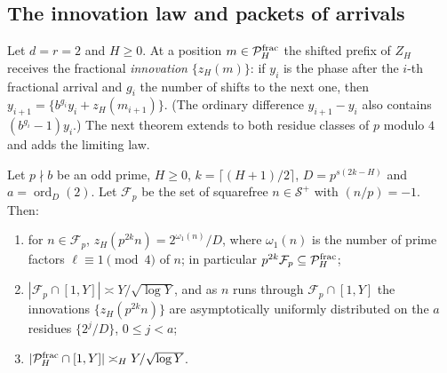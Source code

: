 \documentclass[11pt]{article}
\newcommand{\fr}[1]{\{#1\}}
\DeclareMathOperator{\ord}{ord}
\begin{document}
\subsection{The innovation law and packets of arrivals}

Let $d=r=2$ and $H\ge0$. At a position $m\in\mathcal P_H^{\rm frac}$ the shifted prefix of $Z_H$ receives the fractional
\emph{innovation} $\fr{z_H(m)}$: if $y_i$ is the phase after the $i$-th fractional arrival and $g_i$ the number of
shifts to the next one, then $y_{i+1}=\fr{b^{g_i}y_i+z_H(m_{i+1})}$. (The ordinary difference $y_{i+1}-y_i$ also contains
$(b^{g_i}-1)y_i$.) The next theorem extends  to both residue classes of $p$ modulo $4$ and adds
the limiting law.

\begin{theorem}\label{thm:jumplaw}
Let $p\nmid b$ be an odd prime, $H\ge0$, $k=\lceil(H+1)/2\rceil$, $D=p^{s(2k-H)}$ and $a=\ord_D(2)$. Let $\mathcal F_p$ be
the set of squarefree $n\in\mathcal S^+$ with $(n/p)=-1$. Then:
\begin{enumerate}[label=\textup{(\roman*)},nosep]
\item for $n\in\mathcal F_p$, $z_H(p^{2k}n)=2^{\omega_1(n)}/D$, where $\omega_1(n)$ is the number of prime factors
$\ell\equiv1\pmod4$ of $n$; in particular $p^{2k}\mathcal F_p\subseteq\mathcal P_H^{\rm frac}$;
\item $|\mathcal F_p\cap[1,Y]|\asymp Y/\sqrt{\log Y}$, and as $n$ runs through $\mathcal F_p\cap[1,Y]$ the innovations
$\fr{z_H(p^{2k}n)}$ are asymptotically uniformly distributed on the $a$ residues $\fr{2^j/D}$, $0\le j<a$;
\item $|\mathcal P_H^{\rm frac}\cap[1,Y]|\asymp_HY/\sqrt{\log Y}$.
\end{enumerate}
\end{theorem}
\end{document}
